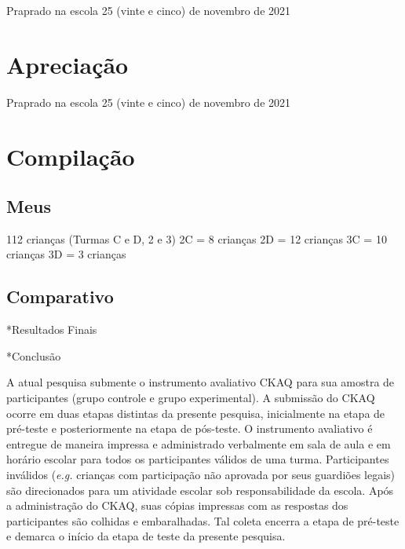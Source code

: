 Praprado na escola 25 (vinte e cinco) de novembro de 2021

\section{Apreciação}\label{sec:apreciar}

Praprado na escola 25 (vinte e cinco) de novembro de 2021

\section{Compilação}\label{sec:compilar}

\subsection{Meus}\label{subsec:meus}


112 crianças (Turmas C e D, 2 e 3)
2C = 8 crianças
2D = 12 crianças
3C = 10 crianças
3D = 3 crianças


\subsection{Comparativo}\label{subsec:outros}



*Resultados Finais

*Conclusão







A atual pesquisa submente o instrumento avaliativo \ac{CKAQ} para sua amostra de participantes (grupo controle e grupo experimental). A submissão do \ac{CKAQ} ocorre em duas etapas distintas da presente pesquisa, inicialmente na etapa de pré-teste e posteriormente na etapa de pós-teste. O instrumento avaliativo é entregue de maneira impressa e administrado verbalmente em sala de aula e em horário escolar para todos os participantes válidos de uma turma. Participantes inválidos (\textit{e.g.} crianças com participação não aprovada por seus guardiões legais) são direcionados para um atividade escolar sob responsabilidade da escola. Após a administração do \ac{CKAQ}, suas cópias impressas com as respostas dos participantes são colhidas e embaralhadas. Tal coleta encerra a etapa de pré-teste e demarca o início da etapa de teste da presente pesquisa.

